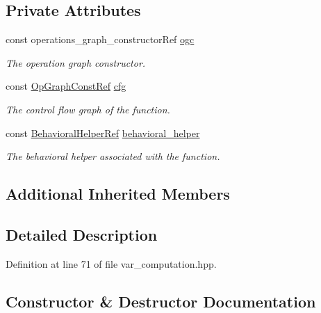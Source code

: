 \subsection*{Private Attributes}
\begin{DoxyCompactItemize}
\item 
const operations\+\_\+graph\+\_\+constructor\+Ref \hyperlink{classVarComputation_ab8ed2054d3cc29ed938c02ab3ec8c319}{ogc}
\begin{DoxyCompactList}\small\item\em The operation graph constructor. \end{DoxyCompactList}\item 
const \hyperlink{op__graph_8hpp_a9a0b240622c47584bee6951a6f5de746}{Op\+Graph\+Const\+Ref} \hyperlink{classVarComputation_aacd88a39d84c8c91bb04a81a18f360ba}{cfg}
\begin{DoxyCompactList}\small\item\em The control flow graph of the function. \end{DoxyCompactList}\item 
const \hyperlink{behavioral__helper_8hpp_a9da8798985d185e76cbde965d9d68f84}{Behavioral\+Helper\+Ref} \hyperlink{classVarComputation_a8b2e4fafbd38459bd4237d0774a5f837}{behavioral\+\_\+helper}
\begin{DoxyCompactList}\small\item\em The behavioral helper associated with the function. \end{DoxyCompactList}\end{DoxyCompactItemize}
\subsection*{Additional Inherited Members}


\subsection{Detailed Description}


Definition at line 71 of file var\+\_\+computation.\+hpp.



\subsection{Constructor \& Destructor Documentation}
\mbox{\label{classVarComputation_ad83a5cc15eae4a3362c40224871ed7c2}} 
